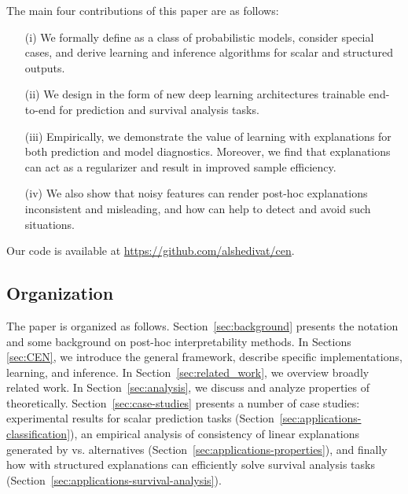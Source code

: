\documentclass[twoside,11pt]{article}
\begin{document}
The main four contributions of this paper are as follows:
\begin{itemize}[noitemsep,topsep=6pt,parsep=2pt,leftmargin=2em]
    \item[(i)] We formally define {\CENs} as a class of probabilistic models, consider special cases, and derive learning and inference algorithms for scalar and structured outputs.

    \item[(ii)] We design {\CENs} in the form of new deep learning architectures trainable end-to-end for prediction and survival analysis tasks.

    \item[(iii)] Empirically, we demonstrate the value of learning with explanations for both prediction and model diagnostics.
    Moreover, we find that explanations can act as a regularizer and result in improved sample efficiency.

    \item[(iv)] We also show that noisy features can render post-hoc explanations inconsistent and misleading, and how {\CENs} can help to detect and avoid such situations.

\end{itemize}

\noindent Our code is available at \url{https://github.com/alshedivat/cen}.

\subsection{Organization}
\label{sec:organization}

The paper is organized as follows.
Section~\ref{sec:background} presents the notation and some background on post-hoc interpretability methods.
In Sections \ref{sec:CEN}, we introduce the general {\CEN} framework, describe specific implementations, learning, and inference.
In Section~\ref{sec:related_work}, we overview broadly related work.
In Section~\ref{sec:analysis}, we discuss and analyze properties of {\CEN} theoretically.
Section~\ref{sec:case-studies} presents a number of case studies:
experimental results for scalar prediction tasks (Section~\ref{sec:applications-classification}),
an empirical analysis of consistency of linear explanations generated by {\CEN} vs. alternatives (Section~\ref{sec:applications-properties}),
and finally how {\CENs} with structured explanations can efficiently solve survival analysis tasks (Section~\ref{sec:applications-survival-analysis}).
 
\end{document}
